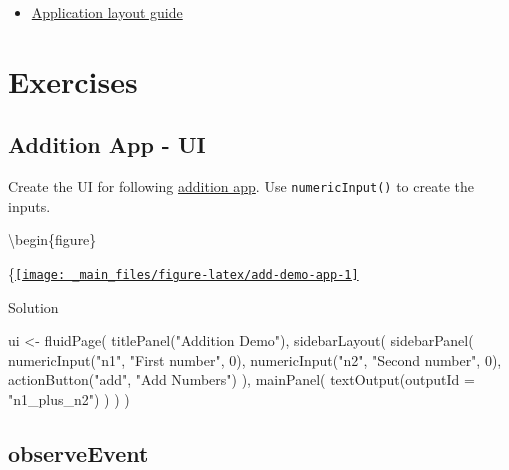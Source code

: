 \documentclass[
]{book}
\newenvironment{Shaded}{\begin{snugshade}}{\end{snugshade}}
\newcommand{\AttributeTok}[1]{\textcolor[rgb]{0.77,0.63,0.00}{#1}}
\newcommand{\DecValTok}[1]{\textcolor[rgb]{0.00,0.00,0.81}{#1}}
\newcommand{\FunctionTok}[1]{\textcolor[rgb]{0.00,0.00,0.00}{#1}}
\newcommand{\NormalTok}[1]{#1}
\newcommand{\OtherTok}[1]{\textcolor[rgb]{0.56,0.35,0.01}{#1}}
\newcommand{\StringTok}[1]{\textcolor[rgb]{0.31,0.60,0.02}{#1}}
\providecommand{\tightlist}{%
  \setlength{\itemsep}{0pt}\setlength{\parskip}{0pt}}
\begin{document}
\begin{itemize}
\tightlist
\item
  \href{https://shiny.rstudio.com/articles/layout-guide.html}{Application layout guide}
\end{itemize}

\hypertarget{exercises-first-app}{%
\section{Exercises}\label{exercises-first-app}}

\hypertarget{addition-app---ui}{%
\subsection{Addition App - UI}\label{addition-app---ui}}

Create the UI for following \href{https://shiny.psy.gla.ac.uk/debruine/add_demo/}{addition app}. Use \texttt{numericInput()} to create the inputs.

\textbackslash begin\{figure\}

\{\centering \href{https://shiny.psy.gla.ac.uk/debruine/add_demo/}{\texttt{[image: \_main\_files/figure-latex/add-demo-app-1]} }

Solution

\begin{Shaded}
\begin{Highlighting}[]
\NormalTok{ui }\OtherTok{\textless{}{-}} \FunctionTok{fluidPage}\NormalTok{(}
  \FunctionTok{titlePanel}\NormalTok{(}\StringTok{"Addition Demo"}\NormalTok{),}
  \FunctionTok{sidebarLayout}\NormalTok{(}
    \FunctionTok{sidebarPanel}\NormalTok{(}
      \FunctionTok{numericInput}\NormalTok{(}\StringTok{"n1"}\NormalTok{, }\StringTok{"First number"}\NormalTok{, }\DecValTok{0}\NormalTok{),}
      \FunctionTok{numericInput}\NormalTok{(}\StringTok{"n2"}\NormalTok{, }\StringTok{"Second number"}\NormalTok{, }\DecValTok{0}\NormalTok{),}
      \FunctionTok{actionButton}\NormalTok{(}\StringTok{"add"}\NormalTok{, }\StringTok{"Add Numbers"}\NormalTok{)}
\NormalTok{    ),}
    \FunctionTok{mainPanel}\NormalTok{(}
      \FunctionTok{textOutput}\NormalTok{(}\AttributeTok{outputId =} \StringTok{"n1\_plus\_n2"}\NormalTok{)}
\NormalTok{    )}
\NormalTok{  )}
\NormalTok{)}
\end{Highlighting}
\end{Shaded}

\hypertarget{observeevent}{%
\subsection{observeEvent}\label{observeevent}}
\end{document}

